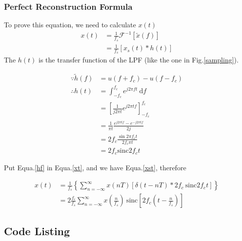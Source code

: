 \documentclass{article}
\begin{document}
\subsubsection*{Perfect Reconstruction Formula}

To prove this equation, we need to calculate $x(t)$
\begin{align}
    x(t) &= \frac{1}{f_s} \mathcal{F}^{-1} \left[ \widetilde{x}(f) \right] \nonumber \\
    &= \frac{1}{f_s} \left[ x_s(t) * h(t) \right] \label{xt}
\end{align}
The $h(t)$ is the transfer function of the LPF (like the one in Fig.\ref{sampling}).

\begin{align}
    \because \widetilde{h}(f) &= u(f + f_c) - u(f - f_c)\nonumber \\
    \therefore h(t) &= \int_{-f_c}^{f_c} e^{j2 \pi ft} ~ \mathrm{d}f \nonumber\\
    &= \left[ \frac{1}{j2 \pi t} e^{j2 \pi t f} \right]_{-f_c }^{f_c}\nonumber \\
    &= \frac{1}{\pi t} \frac{e^{j2 \pi t f} - e^{- j2 \pi t f}}{2j}\nonumber \\
    &= 2f_c \frac{\sin 2\pi f_c t}{2f_c \pi t} \nonumber \\
    &= 2f_c \mathrm{sinc} 2f_c t \label{hf}
\end{align}

Put Equa.\ref{hf} in Equa.\ref{xt}, and we have Equa.\ref{xst}, therefore

\begin{align}
    x(t) &= \frac{1}{f_s} \left\{ \sum_{n = -\infty}^{\infty} x(nT) \left[ \delta(t - nT) * 2f_c ~ \mathrm{sinc} 2f_c t \right] \right\}\nonumber \\
    &= 2 \frac{f_c}{f_s} \sum_{n = -\infty}^{\infty}  x(\frac{n}{f_s}) ~ \mathrm{sinc}\left[ 2f_c(t - \frac{n}{f_s}) \right]
\end{align}



% 
% 

\begin{appendices}
    \section{Code Listing}

\end{appendices}
\end{document}
